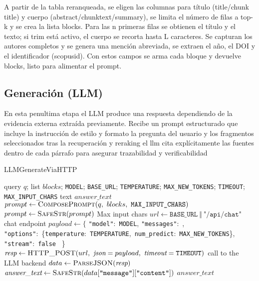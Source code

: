 A partir de la tabla reranqueada, se eligen las columnas para título (title/chunk title) y cuerpo (abstract/chunktext/summary), se limita el número de filas a top-k y se crea la lista blocks.
Para las n primeras filas se obtienen el título y el texto; si trim está activo, el cuerpo se recorta hasta L caracteres.
 Se capturan los autores completos y se genera una mención abreviada, se extraen el año, el DOI y el identificador (scopusid).
 Con estos campos se arma cada bloque y devuelve blocks, listo para alimentar el prompt.

\subsection{Generación (LLM)}\label{subsec:generacion-(llm)}
En esta penultima etapa el LLM produce una respuesta dependiendo de la evidencia externa extraída previamente.
Recibe un prompt estructurado que incluye la instrucción de estilo y formato
la pregunta del usuario y los fragmentos seleccionados tras la recuperación y reraking el llm cita explícitamente las fuentes dentro de cada párrafo para asegurar trazabilidad y verificabilidad
\begin{algorithmEN}[H]
\caption{LLMGenerateViaHTTP}
\begin{algorithmic}[1]
\Require query $q$; list $blocks$; \texttt{MODEL}; \texttt{BASE\_URL}; \texttt{TEMPERATURE}; \texttt{MAX\_NEW\_TOKENS}; \texttt{TIMEOUT}; \texttt{MAX\_INPUT\_CHARS}
\Ensure text $\textit{answer\_text}$
\State $prompt \gets \textsc{ComposePrompt}(q,\ blocks,\ \texttt{MAX\_INPUT\_CHARS})$
\State $prompt \gets \textsc{SafeStr}(prompt)$ \Comment  Max input chars
\State $url \gets \texttt{BASE\_URL}\ \Vert\ \texttt{"/api/chat"}$ \Comment chat endpoint
\State $payload \gets \{$
\Statex \quad \texttt{"model"}:\ \texttt{MODEL},
\Statex \quad \texttt{"messages"}:\ ,
\Statex \quad \texttt{"options"}:\ \{\texttt{temperature}:\ \texttt{TEMPERATURE},\ \texttt{num\_predict}:\ \texttt{MAX\_NEW\_TOKENS}\},
\Statex \quad \texttt{"stream"}:\ \texttt{false}
\Statex \ \}
\State $\textit{resp} \gets \textsc{HTTP\_POST}(url,\ \textit{json}=payload,\ \textit{timeout}=\texttt{TIMEOUT})$ \Comment call to the LLM backend
\State $data \gets \textsc{ParseJSON}(\textit{resp})$
\State $\textit{answer\_text} \gets \textsc{SafeStr}(data[\texttt{"message"}][\texttt{"content"}])$ 
\State \Return $\textit{answer\_text}$
\end{algorithmic}
\end{algorithmEN}

